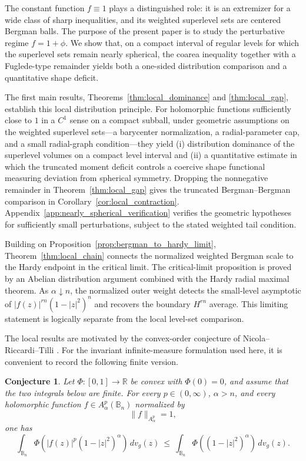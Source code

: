 \documentclass[11pt]{amsart}
\theoremstyle{plain}
\newtheorem{conjecture}[theorem]{Conjecture}
\theoremstyle{definition}
\theoremstyle{remark}
\newcommand{\B}{\mathbb{B}}
\begin{document}
The constant function $f\equiv1$ plays a distinguished role: it is an
extremizer for a wide class of sharp inequalities, and its weighted superlevel
sets are centered Bergman balls. The purpose of the present paper is to study
the perturbative regime $f=1+\phi$. We show that, on a compact interval of
regular levels for which the superlevel sets remain nearly spherical, the
coarea inequality together with a Fuglede-type remainder yields both a
one-sided distribution comparison and a quantitative shape deficit.

The first main results, Theorems~\ref{thm:local_dominance} and
\ref{thm:local_gap}, establish this local distribution principle. For
holomorphic functions sufficiently close to $1$ in a $C^1$ sense on a compact
subball, under geometric assumptions on the weighted superlevel sets---a
barycenter normalization, a radial-parameter cap, and a small radial-graph
condition---they yield (i) distribution dominance of the superlevel volumes on
a compact level interval and (ii) a quantitative estimate in which the
truncated moment deficit controls a coercive shape functional measuring
deviation from spherical symmetry. Dropping the nonnegative remainder in
Theorem~\ref{thm:local_gap} gives the truncated Bergman--Bergman comparison in
Corollary~\ref{cor:local_contraction}. Appendix~\ref{app:nearly_spherical_verification}
verifies the geometric hypotheses for sufficiently small perturbations,
subject to the stated weighted tail condition.

Building on Proposition~\ref{prop:bergman_to_hardy_limit},
Theorem~\ref{thm:local_chain} connects the normalized weighted Bergman scale to
the Hardy endpoint in the critical limit. The critical-limit proposition is
proved by an Abelian distribution argument combined with the Hardy radial
maximal theorem. As $\alpha\downarrow n$, the normalized outer weight detects
the small-level asymptotic of $|f(z)|^{rn}(1-|z|^2)^n$ and recovers the boundary
$H^{rn}$ average. This limiting statement is logically separate from the local
level-set comparison.

The local results are motivated by the convex-order conjecture of
Nicola--Riccardi--Tilli \cite[Conjecture~5.1]{NicolaRiccardiTilli2025}. For the
invariant infinite-measure formulation used here, it is convenient to record
the following finite version.

\begin{conjecture}\cite[Conjecture~5.1]{NicolaRiccardiTilli2025}
\label{conj:convex_functional}
Let $\Phi:[0,1]\to\mathbb{R}$ be convex with $\Phi(0)=0$, and assume that the
two integrals below are finite. For every $p\in(0,\infty)$, $\alpha>n$, and
every holomorphic function $f\in A^p_\alpha(\B_n)$ normalized by
\[
\|f\|_{A^p_\alpha}=1,
\]
one has
\begin{equation*}\label{eq:convex_functional_ineq}
\int_{\B_n}
\Phi\!\left(|f(z)|^p (1-|z|^2)^\alpha\right)\,dv_g(z)
\ \le\
\int_{\B_n}
\Phi\!\left((1-|z|^2)^\alpha\right)\,dv_g(z).
\end{equation*}
\end{conjecture}
\end{document}
